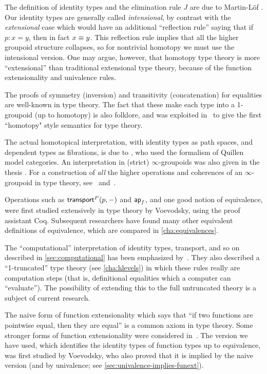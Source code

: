 \sectionNotes

The definition of identity types and the elimination rule $J$ are due to Martin-L\"of \cite{ml:itt}.
Our identity types are generally called \emph{intensional}, by contrast with the \emph{extensional} case which would have an additional ``reflection rule'' saying that if $p:x=y$, then in fact $x\equiv y$.
This reflection rule implies that all the higher groupoid structure collapses, so for nontrivial homotopy we must use the intensional version. 
One may argue, however, that homotopy type theory is more ``extensional'' than traditional extensional type theory, because of the function extensionality and univalence rules.  

The proofs of symmetry (inversion) and transitivity (concatenation) for equalities are well-known in type theory.
The fact that these make each type into a 1-groupoid (up to homotopy) is also folklore, and was exploited in~\cite{hs:gpd-typethy} to give the first ``homotopy" style semantics for type theory.  

The actual homotopical interpretation, with identity types as path spaces, and dependent types as fibrations, is due to \cite{aw:hiit}, who used the formalism of Quillen model categories.  An interpretation in (strict) $\infty$-groupoids was also given in the thesis \cite{mw:thesis}.
For a construction of \emph{all} the higher operations and coherences of an $\infty$-groupoid in type theory, see~\cite{pll:wkom-type} and~\cite{bg:type-wkom}.

Operations such as $\mathsf{transport}^{P}(p,-)$ and $\mathsf{ap}_{f}$, and one good notion of equivalence, were first studied extensively in type theory by Voevodsky, using the proof assistant Coq.
Subsequent researchers have found many other equivalent definitions of equivalence, which are compared in \autoref{cha:equivalences}.

The ``computational'' interpretation of identity types, transport, and so on described in \autoref{sec:computational} has been emphasized by~\cite{lh:canonicity}.
They also described a ``1-truncated'' type theory (see \autoref{cha:hlevels}) in which these rules really are computation steps (that is, definitional equalities which a computer can ``evaluate'').
The possibility of extending this to the full untruncated theory is a subject of current research.

The naive form of function extensionality which says that ``if two functions are pointwise equal, then they are equal'' is a common axiom in type theory.
Some stronger forms of function extensionality were considered in~\cite{garner:depprod}.
The version we have used, which identifies the identity types of function types up to equivalence, was first studied by Voevodsky, who also proved that it is implied by the naive version (and by univalence; see \autoref{sec:univalence-implies-funext}).

